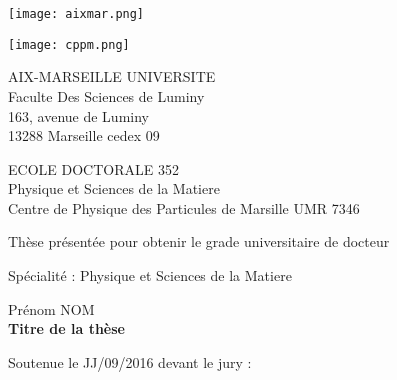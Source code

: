 \titlepage
{}\selectfont{}
\vspace*{-2cm}
\begin{center}
	\begin{minipage}[c]{0.70\linewidth}
		\raggedright \texttt{[image: aixmar.png]} %
	\end{minipage}\hfill
	\begin{minipage}[c]{0.30\linewidth}
		\raggedleft \texttt{[image: cppm.png]}
	\end{minipage}\hfill 
\end{center}
\begin{flushleft}
	\vspace{0.2cm}
	\begin{center}
	 AIX-MARSEILLE UNIVERSITE\\
		Faculte Des Sciences de Luminy\\
		163, avenue de Luminy\\
		13288 Marseille cedex 09
	\end{center}
	\vspace{0.2cm}
	\begin{center}
	 ECOLE DOCTORALE 352\\
	\normalsize Physique et Sciences de la Matiere\\
	Centre de Physique des Particules de Marsille UMR 7346\\
	\end{center}
    \begin{center}
		\vspace{2cm}
		Thèse présentée pour obtenir le grade universitaire de docteur\\
    \end{center}
	\vspace{0.5cm}
		\begin{center}
    Spécialité : Physique et Sciences de la Matiere\\
		\end{center}
    \begin{center}
        \vspace{0.5cm}
        \Large Prénom NOM \\%
        \vspace{1cm}
        \large \bf Titre de la thèse  \\
    \end{center}
	\vspace{3.5cm}
    \normalsize Soutenue le JJ/09/2016 devant le jury :\\
\end{flushleft}

